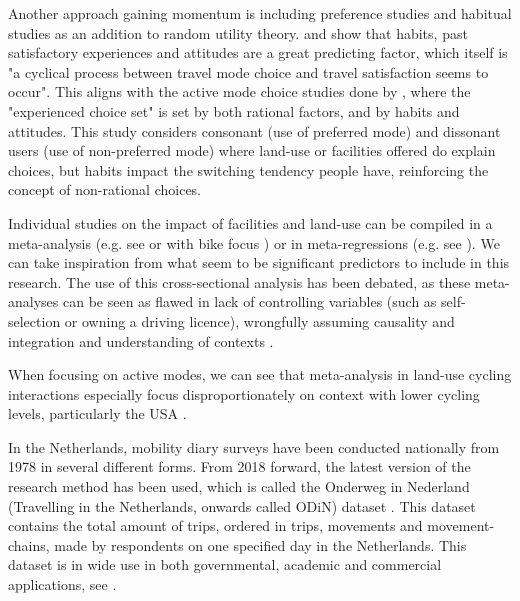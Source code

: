 \documentclass[sigconf, natbib=false, nonacm]{acmart}
\begin{document}
    
    Another approach gaining momentum is including preference studies and habitual studies as an addition to random utility theory. \textcite{de_vos_attitude_2022} and \textcite{de_vos_influence_2015} show that habits, past satisfactory experiences and attitudes are a great predicting factor, which itself is "a cyclical process between travel mode choice and travel satisfaction seems to occur". This aligns with the active mode choice studies done by \textcite{ton_unravelling_2019}, where the "experienced choice set" is set by both rational factors, and by habits and attitudes. This study considers consonant (use of preferred mode) and dissonant users (use of non-preferred mode) where land-use or facilities offered do explain choices, but habits impact the switching tendency people have, reinforcing the concept of non-rational choices.
    
    Individual studies on the impact of facilities and land-use can be compiled in a meta-analysis (e.g. see \cite{ewing_travel_2010, gim_meta-analysis_2012} or with bike focus \cite{buehler_bikeway_2016, muhs_characteristics_2015}) or in meta-regressions (e.g. see \cite{stevens_does_2017}). We can take inspiration from what seem to be significant predictors to include in this research. The use of this cross-sectional analysis has been debated, as these meta-analyses can be seen as flawed in lack of controlling variables (such as self-selection or owning a driving licence), wrongfully assuming causality and integration and understanding of contexts \parencite{naess_meta-analyses_2022, naess_built_2015, van_wee_selfselection_2009, handy_correlation_2005}. 
    
    When focusing on active modes, we can see that meta-analysis in land-use cycling interactions especially focus disproportionately on context with lower cycling levels, particularly the USA \parencite{nello-deakin_assessing_2019}. 

    In the Netherlands, mobility diary surveys have been conducted nationally from 1978 in several different forms. From 2018 forward, the latest version of the research method has been used, which is called the Onderweg in Nederland (Travelling in the Netherlands, onwards called ODiN) dataset \parencite{cbs_onderweg_2022}. This dataset contains the total amount of trips, ordered in trips, movements and movement-chains, made by respondents on one specified day in the Netherlands. This dataset is in wide use in both governmental, academic and commercial applications, see \cite{boonstra_modelling_2022, bakri_inzichten_2023}. 
    
\end{document}
